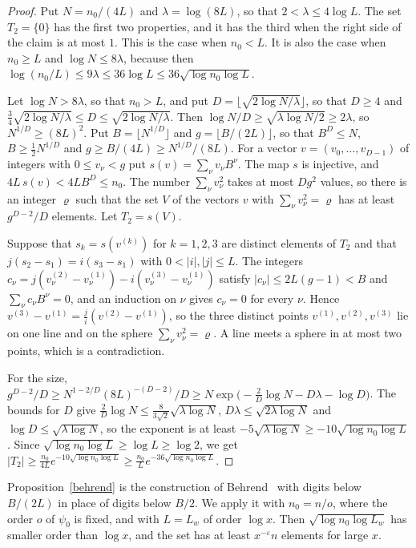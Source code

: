 \begin{proof}
Put $N=n_0/(4L)$ and $\lambda=\log(8L)$, so that $2<\lambda\le4\log L$. The set $T_2=\{0\}$ has the first two properties, and it has the third when the right side of the claim is at most $1$. This is the case when $n_0<L$. It is also the case when $n_0\ge L$ and $\log N\le8\lambda$, because then $\log(n_0/L)\le9\lambda\le36\log L\le36\sqrt{\log n_0\log L}$.

Let $\log N>8\lambda$, so that $n_0>L$, and put $D=\lfloor\sqrt{2\log N/\lambda}\rfloor$, so that $D\ge4$ and $\frac34\sqrt{2\log N/\lambda}\le D\le\sqrt{2\log N/\lambda}$. Then $\log N/D\ge\sqrt{\lambda\log N/2}\ge2\lambda$, so $N^{1/D}\ge(8L)^2$. Put $B=\lfloor N^{1/D}\rfloor$ and $g=\lfloor B/(2L)\rfloor$, so that $B^D\le N$, $B\ge\frac12N^{1/D}$ and $g\ge B/(4L)\ge N^{1/D}/(8L)$. For a vector $v=(v_0,\dots,v_{D-1})$ of integers with $0\le v_\nu<g$ put $s(v)=\sum_\nu v_\nu B^\nu$. The map $s$ is injective, and $4L\,s(v)<4LB^D\le n_0$. The number $\sum_\nu v_\nu^2$ takes at most $Dg^2$ values, so there is an integer $\varrho$ such that the set $V$ of the vectors $v$ with $\sum_\nu v_\nu^2=\varrho$ has at least $g^{D-2}/D$ elements. Let $T_2=s(V)$.

Suppose that $s_k=s(v^{(k)})$ for $k=1,2,3$ are distinct elements of $T_2$ and that $j(s_2-s_1)=i(s_3-s_1)$ with $0<\lvert i\rvert,\lvert j\rvert\le L$. The integers $c_\nu=j(v^{(2)}_\nu-v^{(1)}_\nu)-i(v^{(3)}_\nu-v^{(1)}_\nu)$ satisfy $\lvert c_\nu\rvert\le2L(g-1)<B$ and $\sum_\nu c_\nu B^\nu=0$, and an induction on $\nu$ gives $c_\nu=0$ for every $\nu$. Hence $v^{(3)}-v^{(1)}=\frac ji(v^{(2)}-v^{(1)})$, so the three distinct points $v^{(1)},v^{(2)},v^{(3)}$ lie on one line and on the sphere $\sum_\nu v_\nu^2=\varrho$. A line meets a sphere in at most two points, which is a contradiction.

For the size, $g^{D-2}/D\ge N^{1-2/D}(8L)^{-(D-2)}/D\ge N\exp\big(-\frac2D\log N-D\lambda-\log D\big)$. The bounds for $D$ give $\frac2D\log N\le\frac8{3\sqrt2}\sqrt{\lambda\log N}$, $D\lambda\le\sqrt{2\lambda\log N}$ and $\log D\le\sqrt{\lambda\log N}$, so the exponent is at least $-5\sqrt{\lambda\log N}\ge-10\sqrt{\log n_0\log L}$. Since $\sqrt{\log n_0\log L}\ge\log L\ge\log2$, we get $\lvert T_2\rvert\ge\frac{n_0}{4L}e^{-10\sqrt{\log n_0\log L}}\ge\frac{n_0}Le^{-36\sqrt{\log n_0\log L}}$.
\end{proof}

Proposition~\ref{behrend} is the construction of Behrend~\cite{behrend} with digits below $B/(2L)$ in place of digits below $B/2$. We apply it with $n_0=n/o$, where the order $o$ of $\psi_0$ is fixed, and with $L=L_w$ of order $\log x$. Then $\sqrt{\log n_0\log L_w}$ has smaller order than $\log x$, and the set has at least $x^{-\varepsilon}n$ elements for large $x$.

